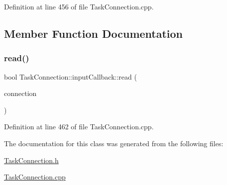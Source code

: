 Definition at line 456 of file Task\+Connection.\+cpp.



\subsection{Member Function Documentation}
\hypertarget{classocra__recipes_1_1TaskConnection_1_1inputCallback_a6572ca3aa11c347ecd414ea760ae89bc}{}\label{classocra__recipes_1_1TaskConnection_1_1inputCallback_a6572ca3aa11c347ecd414ea760ae89bc} 
\subsubsection{\texorpdfstring{read()}{read()}}
{\footnotesize\ttfamily bool Task\+Connection\+::input\+Callback\+::read (\begin{DoxyParamCaption}\item[{yarp\+::os\+::\+Connection\+Reader \&}]{connection }\end{DoxyParamCaption})\hspace{0.3cm}{\ttfamily [virtual]}}



Definition at line 462 of file Task\+Connection.\+cpp.



The documentation for this class was generated from the following files\+:\begin{DoxyCompactItemize}
\item 
\hyperlink{TaskConnection_8h}{Task\+Connection.\+h}\item 
\hyperlink{TaskConnection_8cpp}{Task\+Connection.\+cpp}\end{DoxyCompactItemize}
